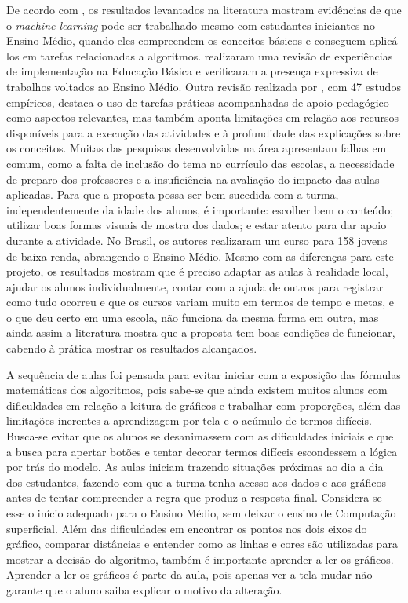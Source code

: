 De acordo com , os resultados levantados na literatura mostram evidências de que o \textit{machine learning} pode ser trabalhado mesmo com estudantes iniciantes no Ensino Médio, quando eles compreendem os conceitos básicos e conseguem aplicá-los em tarefas relacionadas a algoritmos.  realizaram uma revisão de experiências de implementação na Educação Básica e verificaram a presença expressiva de trabalhos voltados ao Ensino Médio. Outra revisão realizada por , com 47 estudos empíricos, destaca o uso de tarefas práticas acompanhadas de apoio pedagógico como aspectos relevantes, mas também aponta limitações em relação aos recursos disponíveis para a execução das atividades e à profundidade das explicações sobre os conceitos. Muitas das pesquisas desenvolvidas na área apresentam falhas em comum, como a falta de inclusão do tema no currículo das escolas, a necessidade de preparo dos professores e a insuficiência na avaliação do impacto das aulas aplicadas. Para que a proposta possa ser bem-sucedida com a turma, independentemente da idade dos alunos, é importante: escolher bem o conteúdo; utilizar boas formas visuais de mostra dos dados; e estar atento para dar apoio durante a atividade. No Brasil, os autores  realizaram um curso para 158 jovens de baixa renda, abrangendo o Ensino Médio. Mesmo com as diferenças para este projeto, os resultados mostram que é preciso adaptar as aulas à realidade local, ajudar os alunos individualmente, contar com a ajuda de outros para registrar como tudo ocorreu e que os cursos variam muito em termos de tempo e metas, e o que deu certo em uma escola, não funciona da mesma forma em outra, mas ainda assim a literatura mostra que a proposta tem boas condições de funcionar, cabendo à prática mostrar os resultados alcançados.

A sequência de aulas foi pensada para evitar iniciar com a exposição das fórmulas matemáticas dos algoritmos, pois sabe-se que ainda existem muitos alunos com dificuldades em relação a leitura de gráficos e trabalhar com proporções, além das limitações inerentes a aprendizagem por tela e o acúmulo de termos difíceis. Busca-se evitar que os alunos se desanimassem com as dificuldades iniciais e que a busca para apertar botões e tentar decorar termos difíceis escondessem a lógica por trás do modelo. As aulas iniciam trazendo situações próximas ao dia a dia dos estudantes, fazendo com que a turma tenha acesso aos dados e aos gráficos antes de tentar compreender a regra que produz a resposta final. Considera-se esse o início adequado para o Ensino Médio, sem deixar o ensino de Computação superficial. Além das dificuldades em encontrar os pontos nos dois eixos do gráfico, comparar distâncias e entender como as linhas e cores são utilizadas para mostrar a decisão do algoritmo, também é importante aprender a ler os gráficos. Aprender a ler os gráficos é parte da aula, pois apenas ver a tela mudar não garante que o aluno saiba explicar o motivo da alteração.

